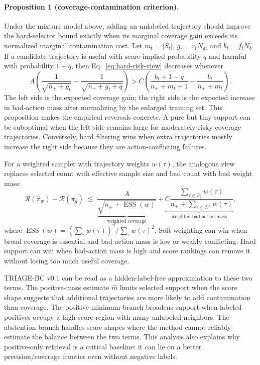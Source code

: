 \documentclass[11pt]{article}
\newcommand{\Dunl}{\mathcal{D}^{u}}
\newcommand{\method}{TRIAGE-BC}
\begin{document}
\paragraph{Proposition 1 (coverage-contamination criterion).}
Under the mixture model above, adding an unlabeled trajectory should improve the hard-selector bound exactly when its marginal coverage gain exceeds its normalized marginal contamination cost. Let $m_t=|S_t|$, $g_t=r_tN_g$, and $b_t=f_tN_b$. If a candidate trajectory is useful with score-implied probability $q$ and harmful with probability $1-q$, then Eq.~\ref{eq:hard-risk-view} decreases whenever
\begin{equation}
  A\left(
  \frac{1}{\sqrt{n_+ + g_t}} -
  \frac{1}{\sqrt{n_+ + g_t + q}}
  \right)
  >
  C\left(
  \frac{b_t + 1 - q}{n_+ + m_t + 1} -
  \frac{b_t}{n_+ + m_t}
  \right).
  \label{eq:marginal-support}
\end{equation}
The left side is the expected coverage gain; the right side is the expected increase in bad-action mass after normalizing by the enlarged training set. This proposition makes the empirical reversals concrete. A pure but tiny support can be suboptimal when the left side remains large for moderately risky coverage trajectories. Conversely, hard filtering wins when extra trajectories mostly increase the right side because they are action-conflicting failures.

For a weighted sampler with trajectory weights $w(\tau)$, the analogous view replaces selected count with effective sample size and bad count with bad weight mass:
\begin{equation}
  \mathcal{R}(\hat{\pi}_w) - \mathcal{R}(\pi_g)
  \;\lesssim\;
  \underbrace{\frac{A}{\sqrt{n_+ + \operatorname{ESS}(w)}}}_{\text{weighted coverage}}
  +
  \underbrace{
  C\frac{\sum_{\tau\in P_b}w(\tau)}
          {n_+ + \sum_{\tau\in\Dunl}w(\tau)}
  }_{\text{weighted bad-action mass}},
  \label{eq:weighted-risk-view}
\end{equation}
where $\operatorname{ESS}(w)=(\sum_\tau w(\tau))^2/\sum_\tau w(\tau)^2$. Soft weighting can win when broad coverage is essential and bad-action mass is low or weakly conflicting. Hard support can win when bad-action mass is high and score rankings can remove it without losing too much useful coverage.

\method{} v0.1 can be read as a hidden-label-free approximation to these two terms. The positive-mass estimate $\hat{m}$ limits selected support when the score shape suggests that additional trajectories are more likely to add contamination than coverage. The positive-minimum branch broadens support when labeled positives occupy a high-score region with many unlabeled neighbors. The abstention branch handles score shapes where the method cannot reliably estimate the balance between the two terms. This analysis also explains why positive-only retrieval is a critical baseline: it can lie on a better precision/coverage frontier even without negative labels.
\end{document}
